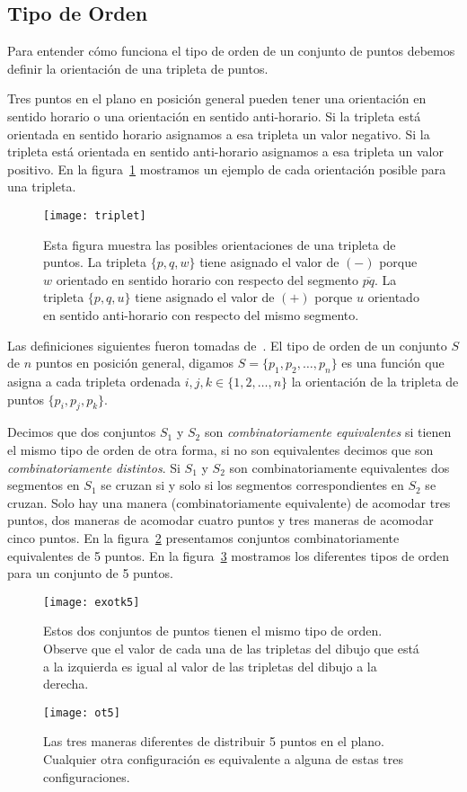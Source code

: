 \subsection{Tipo de Orden}

Para entender cómo funciona el tipo de orden de un conjunto de puntos
debemos definir la orientación de una tripleta de puntos.

Tres puntos en el plano en posición general pueden tener una orientación en sentido horario
o una orientación en sentido anti-horario. Si la tripleta está orientada en sentido horario
asignamos a esa tripleta un valor negativo. Si la tripleta está orientada en sentido anti-horario
asignamos a esa tripleta un valor positivo. En la figura~\ref{fig:triplet} mostramos un ejemplo de
cada orientación posible para una tripleta.
\begin{figure}[htpb]
  \centering
  \texttt{[image: triplet]}
  \caption{Esta figura muestra las posibles orientaciones de una tripleta de puntos. La tripleta $\{p,q,w\}$ tiene
  asignado el valor de $(-)$ porque $w$ orientado en sentido horario con respecto del segmento $\overline{pq}$. La tripleta $\{p,q,u\}$
  tiene asignado el valor de $(+)$  porque $u$ orientado en sentido anti-horario con respecto del mismo segmento.}
  \label{fig:triplet}
\end{figure}

Las definiciones siguientes fueron tomadas de~\cite{Aichholzer2002}.
El tipo de orden de un conjunto $S$ de $n$ puntos en posición general, digamos
$S=\{p_1,p_2,\dots,p_n\}$ es una función que asigna a cada tripleta ordenada
$i,j,k \in \{1,2,\dots,n\}$ la orientación de la tripleta de puntos $\{p_i,p_j,p_k\}$.

Decimos que dos conjuntos $S_1$ y $S_2$ son \emph{combinatoriamente equivalentes} si
tienen el mismo tipo de orden de otra forma, si no son equivalentes decimos que son
\emph{combinatoriamente distintos}. Si $S_1$ y $S_2$ son combinatoriamente equivalentes
dos segmentos en $S_1$ se cruzan si y solo si los segmentos correspondientes en $S_2$
se cruzan. Solo hay una manera (combinatoriamente equivalente) de acomodar tres puntos,
dos maneras de acomodar cuatro puntos y tres maneras de acomodar cinco puntos.
En la figura~\ref{fig:exotk5} presentamos conjuntos
combinatoriamente equivalentes de 5 puntos. En la figura~\ref{fig:ot5}
mostramos los diferentes tipos de orden para un conjunto de 5 puntos.

\begin{figure}[htpb]
  \centering
  \texttt{[image: exotk5]}
  \caption{Estos dos conjuntos de puntos tienen el mismo tipo de orden.
  Observe que el valor de cada una de las tripletas del dibujo
  que está a la izquierda es igual al valor de las tripletas del
  dibujo a la derecha.}
  \label{fig:exotk5}
\end{figure}
\begin{figure}[htpb]
  \centering
  \texttt{[image: ot5]}
  \caption{Las tres maneras diferentes de distribuir 5 puntos en el plano. Cualquier
  otra configuración es equivalente a alguna de estas tres configuraciones.}
  \label{fig:ot5}
\end{figure}

